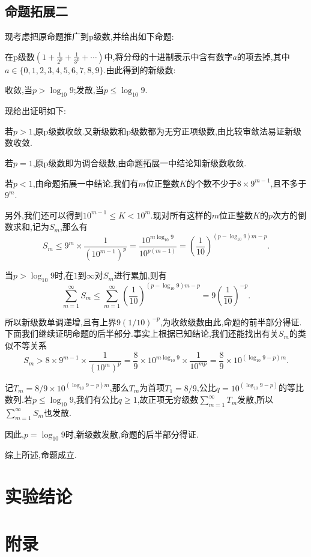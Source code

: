 \documentclass[a4paper,12pt]{article}
\begin{document}
\begin{CJK*}{UTF8}{gbsn}
\subsection{命题拓展二}
\noindent 现考虑把原命题推广到p级数,并给出如下命题:\par\vspace{5pt}
在p级数$\displaystyle(1+\frac{1}{2^p}+\frac{1}{3^p}+\cdots)$中,将分母的十进制表示中含有数字$a$的项去掉,其中$a\in\{0,1,2,3,4,5,6,7,8,9\}$.由此得到的新级数:
\begin{center}
收敛,当$p>\log_{10}9$;发散,当$p\leqslant\log_{10}9$.
\end{center}
现给出证明如下:\par\vspace{5pt}
若$p>1$,原p级数收敛.又新级数和p级数都为无穷正项级数,由比较审敛法易证新级数收敛.\par 若$p=1$,原p级数即为调合级数,由命题拓展一中结论知新级数收敛.\par 若$p<1$,由命题拓展一中结论,我们有$m$位正整数$K$的个数不少于$8\times9^{m-1}$,且不多于$9^m$.\par
另外,我们还可以得到$10^{m-1}\leqslant K<10^m$.现对所有这样的$m$位正整数$K$的$p$次方的倒数求和,记为$S_m$,那么有
\begin{equation*}
S_m\leqslant9^m\times\frac{1}{(10^{m-1})^p}=\frac{10^{m\log_{10}9}}{10^{p(m-1)}}=(\frac{1}{10})^{(p-\log_{10}9)m-p}.
\end{equation*}\par
当$p>\log_{10}9$时,在$1$到$\infty$对$S_m$进行累加,则有
\begin{equation*}
\sum_{m=1}^{\infty}S_m\leqslant\sum_{m=1}^{\infty}(\frac{1}{10})^{(p-\log_{10}9)m-p}=9(\frac{1}{10})^{-p}.
\end{equation*}\par
所以新级数单调递增,且有上界$9(1/10)^{-p}$,为收敛级数由此,命题的前半部分得证.下面我们继续证明命题的后半部分.事实上根据已知结论,我们还能找出有关$S_m$的类似不等关系
\begin{equation*}
S_m>8\times9^{m-1}\times\frac{1}{(10^m)^p}=\frac{8}{9}\times10^{m\log_{10}9}\times\frac{1}{10^{mp}}=\frac{8}{9}\times10^{(\log_{10}9-p)m}.
\end{equation*}\par
记$T_m=8/9\times10^{(\log_{10}9-p)m}$,那么$T_m$为首项$T_1=8/9$,公比$q=10^{(\log_{10}9-p)}$的等比数列.若$p\leqslant\log_{10}9$,我们有公比$q\geqslant1$,故正项无穷级数$\sum_{m=1}^{\infty}T_m$发散,所以$\sum_{m=1}^{\infty}S_m$也发散.\par
因此,$p=\log_{10}9$时,新级数发散,命题的后半部分得证.\par
综上所述,命题成立.
\section{实验结论}

\section{附录}

\end{CJK*}
\end{document}
